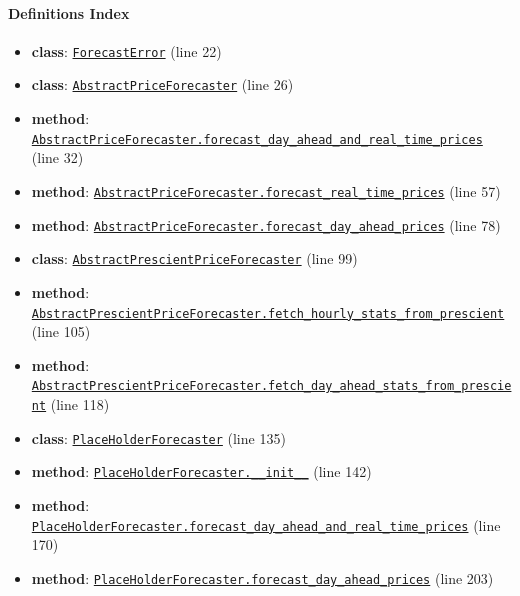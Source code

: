 \documentclass[11pt]{report}
\begin{document}
\paragraph{Definitions Index}
\begin{itemize}[leftmargin=*]
  \item \textbf{class}: \hyperref[def:forecaster.py:ForecastError:L22]{\texttt{ForecastError}} (line 22)
  \item \textbf{class}: \hyperref[def:forecaster.py:AbstractPriceForecaster:L26]{\texttt{AbstractPriceForecaster}} (line 26)
  \item \textbf{method}: \hyperref[def:forecaster.py:AbstractPriceForecaster.forecast_day_ahead_and_real_time_prices:L32]{\texttt{AbstractPriceForecaster.forecast\_day\_ahead\_and\_real\_time\_prices}} (line 32)
  \item \textbf{method}: \hyperref[def:forecaster.py:AbstractPriceForecaster.forecast_real_time_prices:L57]{\texttt{AbstractPriceForecaster.forecast\_real\_time\_prices}} (line 57)
  \item \textbf{method}: \hyperref[def:forecaster.py:AbstractPriceForecaster.forecast_day_ahead_prices:L78]{\texttt{AbstractPriceForecaster.forecast\_day\_ahead\_prices}} (line 78)
  \item \textbf{class}: \hyperref[def:forecaster.py:AbstractPrescientPriceForecaster:L99]{\texttt{AbstractPrescientPriceForecaster}} (line 99)
  \item \textbf{method}: \hyperref[def:forecaster.py:AbstractPrescientPriceForecaster.fetch_hourly_stats_from_prescient:L105]{\texttt{AbstractPrescientPriceForecaster.fetch\_hourly\_stats\_from\_prescient}} (line 105)
  \item \textbf{method}: \hyperref[def:forecaster.py:AbstractPrescientPriceForecaster.fetch_day_ahead_stats_from_prescient:L118]{\texttt{AbstractPrescientPriceForecaster.fetch\_day\_ahead\_stats\_from\_prescient}} (line 118)
  \item \textbf{class}: \hyperref[def:forecaster.py:PlaceHolderForecaster:L135]{\texttt{PlaceHolderForecaster}} (line 135)
  \item \textbf{method}: \hyperref[def:forecaster.py:PlaceHolderForecaster.__init__:L142]{\texttt{PlaceHolderForecaster.\_\_init\_\_}} (line 142)
  \item \textbf{method}: \hyperref[def:forecaster.py:PlaceHolderForecaster.forecast_day_ahead_and_real_time_prices:L170]{\texttt{PlaceHolderForecaster.forecast\_day\_ahead\_and\_real\_time\_prices}} (line 170)
  \item \textbf{method}: \hyperref[def:forecaster.py:PlaceHolderForecaster.forecast_day_ahead_prices:L203]{\texttt{PlaceHolderForecaster.forecast\_day\_ahead\_prices}} (line 203)

\end{itemize}
\end{document}
